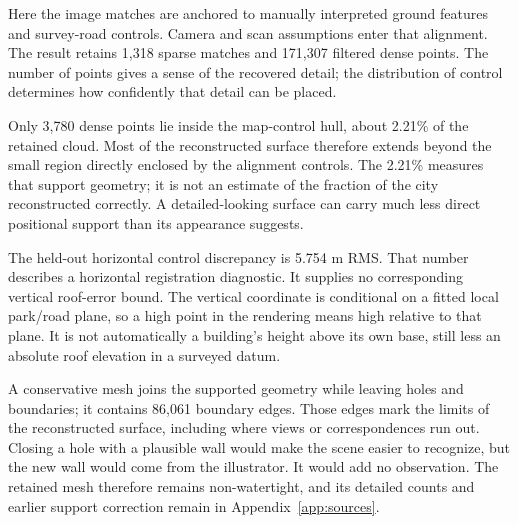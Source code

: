 Here the image matches are anchored to manually interpreted ground features and survey-road controls. Camera and scan assumptions enter that alignment. The result retains 1,318 sparse matches and 171,307 filtered dense points. The number of points gives a sense of the recovered detail; the distribution of control determines how confidently that detail can be placed.


Only 3,780 dense points lie inside the map-control hull, about 2.21\% of the retained cloud. Most of the reconstructed surface therefore extends beyond the small region directly enclosed by the alignment controls. The 2.21\% measures that support geometry; it is not an estimate of the fraction of the city reconstructed correctly. A detailed-looking surface can carry much less direct positional support than its appearance suggests.

The held-out horizontal control discrepancy is 5.754 m RMS. That number describes a horizontal registration diagnostic. It supplies no corresponding vertical roof-error bound. The vertical coordinate is conditional on a fitted local park/road plane, so a high point in the rendering means high relative to that plane. It is not automatically a building's height above its own base, still less an absolute roof elevation in a surveyed datum.

\FloatBarrier
A conservative mesh joins the supported geometry while leaving holes and boundaries; it contains 86,061 boundary edges. Those edges mark the limits of the reconstructed surface, including where views or correspondences run out. Closing a hole with a plausible wall would make the scene easier to recognize, but the new wall would come from the illustrator. It would add no observation. The retained mesh therefore remains non-watertight, and its detailed counts and earlier support correction remain in Appendix~\ref{app:sources}.

